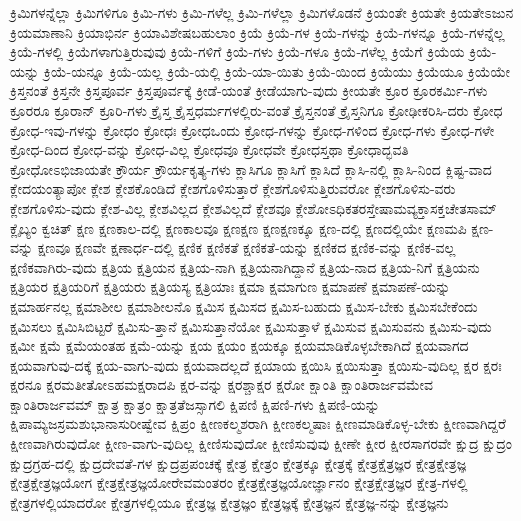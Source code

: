 {ಕ್ರಿಮಿಗಳನ್ನೆಲ್ಲಾ
ಕ್ರಿಮಿಗಳಿಗೂ
ಕ್ರಿಮಿ-ಗಳು
ಕ್ರಿಮಿ-ಗಳೆಲ್ಲ
ಕ್ರಿಮಿ-ಗಳೆಲ್ಲಾ
ಕ್ರಿಮಿಗಳೊಡನೆ
ಕ್ರಿಯಂತೇ
ಕ್ರಿಯತೇ
ಕ್ರಿಯತೇಽಜುನ
ಕ್ರಿಯಮಾಣಾನಿ
ಕ್ರಿಯಾಭಿರ್ನ
ಕ್ರಿಯಾವಿಶೇಷಬಹುಲಾಂ
ಕ್ರಿಯೆ
ಕ್ರಿಯೆ-ಗಳ
ಕ್ರಿಯೆ-ಗಳನ್ನು
ಕ್ರಿಯೆ-ಗಳನ್ನೂ
ಕ್ರಿಯೆ-ಗಳನ್ನೆಲ್ಲ
ಕ್ರಿಯೆ-ಗಳಲ್ಲಿ
ಕ್ರಿಯೆಗಳಾಗುತ್ತಿರುವುವು
ಕ್ರಿಯೆ-ಗಳಿಗೆ
ಕ್ರಿಯೆ-ಗಳು
ಕ್ರಿಯೆ-ಗಳೂ
ಕ್ರಿಯೆ-ಗಳೆಲ್ಲ
ಕ್ರಿಯೆಗೆ
ಕ್ರಿಯೆಯ
ಕ್ರಿಯೆ-ಯನ್ನು
ಕ್ರಿಯೆ-ಯನ್ನೂ
ಕ್ರಿಯೆ-ಯಲ್ಲ
ಕ್ರಿಯೆ-ಯಲ್ಲಿ
ಕ್ರಿಯೆ-ಯಾ-ಯಿತು
ಕ್ರಿಯೆ-ಯಿಂದ
ಕ್ರಿಯೆಯು
ಕ್ರಿಯೆಯೂ
ಕ್ರಿಯೆಯೇ
ಕ್ರಿಸ್ತನಂತೆ
ಕ್ರಿಸ್ತನೇ
ಕ್ರಿಸ್ತಪೂರ್ವ
ಕ್ರಿಸ್ತಪೂರ್ವಕ್ಕೆ
ಕ್ರೀಡೆ-ಯಂತೆ
ಕ್ರೀಡೆಯಾಗು-ವುದು
ಕ್ರೀಯತೇ
ಕ್ರೂರ
ಕ್ರೂರಕರ್ಮಿ-ಗಳು
ಕ್ರೂರರೂ
ಕ್ರೂರಾನ್
ಕ್ರೂರಿ-ಗಳು
ಕ್ರೈಸ್ತ
ಕ್ರೈಸ್ತಧರ್ಮಗಳಲ್ಲಿರು-ವಂತೆ
ಕ್ರೈಸ್ತನಂತೆ
ಕ್ರೈಸ್ತನಿಗೂ
ಕ್ರೋಢೀಕರಿಸಿ-ದರು
ಕ್ರೋಧ
ಕ್ರೋಧ-ಇವು-ಗಳನ್ನು
ಕ್ರೋಧಂ
ಕ್ರೋಧಃ
ಕ್ರೋಧಒಂದು
ಕ್ರೋಧ-ಗಳನ್ನು
ಕ್ರೋಧ-ಗಳಿಂದ
ಕ್ರೋಧ-ಗಳು
ಕ್ರೋಧ-ಗಳೇ
ಕ್ರೋಧ-ದಿಂದ
ಕ್ರೋಧ-ವನ್ನು
ಕ್ರೋಧ-ವಿಲ್ಲ
ಕ್ರೋಧವೂ
ಕ್ರೋಧವೇ
ಕ್ರೋಧಸ್ತಥಾ
ಕ್ರೋಧಾದ್ಭವತಿ
ಕ್ರೋಧೋಽಭಿಜಾಯತೇ
ಕ್ರೌರ್ಯ
ಕ್ರೌರ್ಯಕೃತ್ಯ-ಗಳು
ಕ್ಲಾಸಿಗೂ
ಕ್ಲಾಸಿಗೆ
ಕ್ಲಾಸಿದೆ
ಕ್ಲಾಸಿ-ನಲ್ಲಿ
ಕ್ಲಾಸಿ-ನಿಂದ
ಕ್ಲಿಷ್ಟ-ವಾದ
ಕ್ಲೇದಯಂತ್ಯಾಪೋ
ಕ್ಲೇಶ
ಕ್ಲೇಶಕೊಂಡಿದೆ
ಕ್ಲೇಶಗೊಳಿಸುತ್ತಾರೆ
ಕ್ಲೇಶಗೊಳಿಸುತ್ತಿರುವರೋ
ಕ್ಲೇಶಗೊಳಿಸು-ವರು
ಕ್ಲೇಶಗೊಳಿಸು-ವುದು
ಕ್ಲೇಶ-ವಿಲ್ಲ
ಕ್ಲೇಶವಿಲ್ಲದ
ಕ್ಲೇಶವಿಲ್ಲದೆ
ಕ್ಲೇಶವೂ
ಕ್ಲೇಶೋಽಧಿಕತರಸ್ತೇಷಾಮವ್ಯಕ್ತಾಸಕ್ತಚೇತಸಾಮ್
ಕ್ಲೈಬ್ಯಂ
ಕ್ವಚಿತ್
ಕ್ಷಣ
ಕ್ಷಣಕಾಲ-ದಲ್ಲಿ
ಕ್ಷಣಕಾಲವೂ
ಕ್ಷಣಕ್ಷಣ
ಕ್ಷಣಕ್ಷಣಕ್ಕೂ
ಕ್ಷಣ-ದಲ್ಲಿ
ಕ್ಷಣದಲ್ಲಿಯೇ
ಕ್ಷಣಮಪಿ
ಕ್ಷಣ-ವನ್ನು
ಕ್ಷಣವೂ
ಕ್ಷಣವೇ
ಕ್ಷಣಾರ್ಧ-ದಲ್ಲಿ
ಕ್ಷಣಿಕ
ಕ್ಷಣಿಕತೆ
ಕ್ಷಣಿಕತೆ-ಯನ್ನು
ಕ್ಷಣಿಕದ
ಕ್ಷಣಿಕ-ವನ್ನು
ಕ್ಷಣಿಕ-ವಲ್ಲ
ಕ್ಷಣಿಕವಾಗಿರು-ವುದು
ಕ್ಷತ್ರಿಯ
ಕ್ಷತ್ರಿಯನ
ಕ್ಷತ್ರಿಯ-ನಾಗಿ
ಕ್ಷತ್ರಿಯನಾಗಿದ್ದಾನೆ
ಕ್ಷತ್ರಿಯ-ನಾದ
ಕ್ಷತ್ರಿಯ-ನಿಗೆ
ಕ್ಷತ್ರಿಯನು
ಕ್ಷತ್ರಿಯರ
ಕ್ಷತ್ರಿಯರಿಗೆ
ಕ್ಷತ್ರಿಯರು
ಕ್ಷತ್ರಿಯಸ್ಯ
ಕ್ಷತ್ರಿಯಾಃ
ಕ್ಷಮಾ
ಕ್ಷಮಾಗುಣ
ಕ್ಷಮಾಪಣೆ
ಕ್ಷಮಾಪಣೆ-ಯನ್ನು
ಕ್ಷಮಾರ್ಹನಲ್ಲ
ಕ್ಷಮಾಶೀಲ
ಕ್ಷಮಾಶೀಲನೊ
ಕ್ಷಮಿಸ
ಕ್ಷಮಿಸದ
ಕ್ಷಮಿಸ-ಬಹುದು
ಕ್ಷಮಿಸ-ಬೇಕು
ಕ್ಷಮಿಸಬೇಕೆಂದು
ಕ್ಷಮಿಸಲು
ಕ್ಷಮಿಸಿಬಿಟ್ಟರೆ
ಕ್ಷಮಿಸು-ತ್ತಾನೆ
ಕ್ಷಮಿಸುತ್ತಾನೆಯೋ
ಕ್ಷಮಿಸುತ್ತಾಳೆ
ಕ್ಷಮಿಸುವ
ಕ್ಷಮಿಸುವನು
ಕ್ಷಮಿಸು-ವುದು
ಕ್ಷಮೀ
ಕ್ಷಮೆ
ಕ್ಷಮೆಯಂತಹ
ಕ್ಷಮೆ-ಯನ್ನು
ಕ್ಷಯ
ಕ್ಷಯಂ
ಕ್ಷಯಕ್ಕೂ
ಕ್ಷಯಮಾಡಿಕೊಳ್ಳಬೇಕಾಗಿದೆ
ಕ್ಷಯವಾಗದ
ಕ್ಷಯವಾಗುವು-ದಕ್ಕೆ
ಕ್ಷಯ-ವಾಗು-ವುದು
ಕ್ಷಯವಾದಲ್ಲದೆ
ಕ್ಷಯಾಯ
ಕ್ಷಯಿಸಿ
ಕ್ಷಯಿಸುತ್ತಾ
ಕ್ಷಯಿಸು-ವುದಿಲ್ಲ
ಕ್ಷರ
ಕ್ಷರಃ
ಕ್ಷರನೂ
ಕ್ಷರಮತೀತೋಽಹಮಕ್ಷರಾದಪಿ
ಕ್ಷರ-ವನ್ನು
ಕ್ಷರಶ್ಚಾಕ್ಷರ
ಕ್ಷರೋ
ಕ್ಷಾಂತಿ
ಕ್ಷಾಂತಿರಾರ್ಜವಮೇವ
ಕ್ಷಾಂತಿರಾರ್ಜವಮ್
ಕ್ಷಾತ್ರ
ಕ್ಷಾತ್ರಂ
ಕ್ಷಾತ್ರತೆಜಸ್ಸಾಗಲಿ
ಕ್ಷಿಪಣಿ
ಕ್ಷಿಪಣಿ-ಗಳು
ಕ್ಷಿಪಣಿ-ಯನ್ನು
ಕ್ಷಿಪಾಮ್ಯಜಸ್ರಮಶುಭಾನಾಸುರೀಷ್ವೇವ
ಕ್ಷಿಪ್ರಂ
ಕ್ಷೀಣಕಲ್ಮಶರಾಗಿ
ಕ್ಷೀಣಕಲ್ಮಷಾಃ
ಕ್ಷೀಣಮಾಡಿಕೊಳ್ಳ-ಬೇಕು
ಕ್ಷೀಣವಾಗಿದ್ದರೆ
ಕ್ಷೀಣವಾಗಿರುವುದೋ
ಕ್ಷೀಣ-ವಾಗು-ವುದಿಲ್ಲ
ಕ್ಷೀಣಿಸುವುದೋ
ಕ್ಷೀಣಿಸುವುವು
ಕ್ಷೀಣೇ
ಕ್ಷೀರ
ಕ್ಷೀರಸಾಗರವೇ
ಕ್ಷುದ್ರ
ಕ್ಷುದ್ರಂ
ಕ್ಷುದ್ರಗ್ರಹ-ದಲ್ಲಿ
ಕ್ಷುದ್ರದೇವತೆ-ಗಳ
ಕ್ಷುದ್ರಪ್ರಪಂಚಕ್ಕೆ
ಕ್ಷೇತ್ರ
ಕ್ಷೇತ್ರಂ
ಕ್ಷೇತ್ರಕ್ಕೂ
ಕ್ಷೇತ್ರಕ್ಕೆ
ಕ್ಷೇತ್ರಕ್ಷೆತ್ರಜ್ಞರ
ಕ್ಷೇತ್ರಕ್ಷೇತ್ರಜ್ಞ
ಕ್ಷೇತ್ರಕ್ಷೇತ್ರಜ್ಞಯೋಗ
ಕ್ಷೇತ್ರಕ್ಷೇತ್ರಜ್ಞಯೋರೇವಮಂತರಂ
ಕ್ಷೇತ್ರಕ್ಷೇತ್ರಜ್ಞಯೋರ್ಜ್ಞಾನಂ
ಕ್ಷೇತ್ರಕ್ಷೇತ್ರಜ್ಞರ
ಕ್ಷೇತ್ರ-ಗಳಲ್ಲಿ
ಕ್ಷೇತ್ರಗಳಲ್ಲಿಯಾದರೋ
ಕ್ಷೇತ್ರಗಳಲ್ಲಿಯೂ
ಕ್ಷೇತ್ರಜ್ಞ
ಕ್ಷೇತ್ರಜ್ಞಂ
ಕ್ಷೇತ್ರಜ್ಞಕ್ಕೆ
ಕ್ಷೇತ್ರಜ್ಞನ
ಕ್ಷೇತ್ರಜ್ಞ-ನನ್ನು
ಕ್ಷೇತ್ರಜ್ಞನು
}
